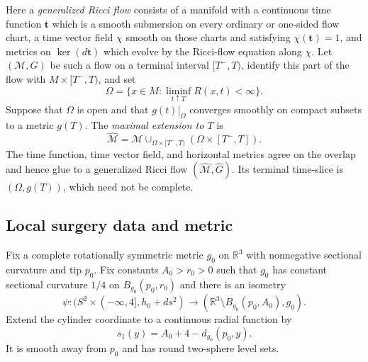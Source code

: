 \begin{definition}
\label{def:maximal-ricci-flow-extension}
\notready
Here a \emph{generalized Ricci flow} consists of a manifold with a
continuous time function $\mathbf t$ which is a smooth submersion on every
ordinary or one-sided flow chart, a time vector field $\chi$ smooth on those
charts and satisfying $\chi(\mathbf t)=1$, and metrics on
$\ker(d\mathbf t)$ which evolve by the Ricci-flow equation along $\chi$.
Let $(\mathcal M,G)$ be such a
flow on a terminal interval
$[T^-,T)$, identify this part of the flow with $M\times[T^-,T)$, and set
\[
 \Omega=\{x\in M:\liminf_{t\uparrow T}R(x,t)<\infty\}.
\]
Suppose that $\Omega$ is open and that $g(t)|_\Omega$ converges smoothly
on compact subsets to a metric $g(T)$.  The \emph{maximal extension to
$T$} is
\[
 \widehat{\mathcal M}
 =\mathcal M\cup_{\Omega\times[T^-,T)}
   (\Omega\times[T^-,T]).
\]
The time function, time vector field, and horizontal metrics agree on the
overlap and hence glue to a generalized Ricci flow
$(\widehat{\mathcal M},\widehat G)$.  Its terminal time-slice is
$(\Omega,g(T))$, which need not be complete.
\end{definition}

\subsection{Local surgery data and metric}

\begin{definition}
\label{def:standard-surgery-cap-model}
\notready
Fix a complete rotationally symmetric metric $g_0$ on $\mathbb R^3$ with
nonnegative sectional curvature and tip $p_0$.  Fix constants
$A_0>r_0>0$ such that $g_0$ has constant sectional curvature $1/4$ on
$B_{g_0}(p_0,r_0)$ and there is an isometry
\[
 \psi\colon(S^2\times(-\infty,4],h_0+ds^2)
 \longrightarrow(\mathbb R^3\setminus B_{g_0}(p_0,A_0),g_0).
\]
Extend the cylinder coordinate to a continuous radial function by
\[
 s_1(y)=A_0+4-d_{g_0}(p_0,y).
\]
It is smooth away from $p_0$ and has round two-sphere level sets.
\end{definition}

